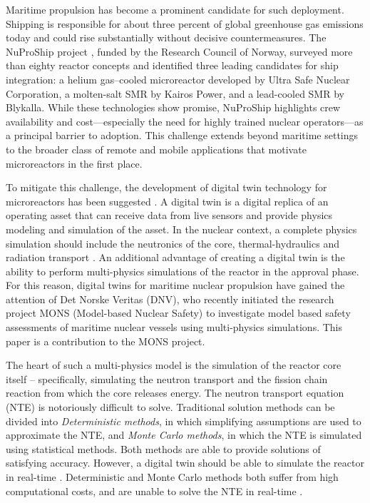 \documentclass[%
 reprint,
 amsmath,amssymb,
 aps,
]{revtex4-1}
\begin{document}
Maritime propulsion has become a prominent candidate for such deployment. Shipping is responsible for about three percent of global greenhouse gas
emissions today and could rise substantially without decisive countermeasures. The NuProShip project \cite{nuproship}, funded by the Research
Council of Norway, surveyed more than eighty reactor concepts and identified three leading candidates for ship integration: a helium gas–cooled
microreactor developed by Ultra Safe Nuclear Corporation, a molten-salt SMR by Kairos Power, and a lead-cooled SMR by Blykalla. While these
technologies show promise, NuProShip highlights crew availability and cost—especially the need for highly trained nuclear operators—as a
principal barrier to adoption. This challenge extends beyond maritime settings to the broader class of remote and mobile applications that
motivate microreactors in the first place.

To mitigate this challenge, the development of digital twin technology for microreactors has been suggested \cite{MAGNET}. A digital twin is a
digital replica of an operating asset that can receive data from live sensors and provide physics modeling and simulation of the asset. In the
nuclear context, a complete physics simulation should include the neutronics of the core, thermal-hydraulics and radiation transport
\cite{DT2024review}. An additional advantage of creating a digital twin is the ability to perform multi-physics simulations of the reactor in
the approval phase. For this reason, digital twins for maritime nuclear propulsion have gained the attention of Det Norske Veritas
(DNV), who recently initiated the research project MONS (Model-based Nuclear Safety) to investigate model based safety assessments of maritime
nuclear vessels using multi-physics simulations. This paper is a contribution to the MONS project.

The heart of such a multi-physics model is the simulation of the reactor core itself – specifically, simulating the neutron transport and the fission
chain reaction from which the core releases energy. The neutron transport equation (NTE) is notoriously difficult to solve. Traditional solution methods
can be divided into \textit{Deterministic methods}, in which simplifying assumptions are used to approximate the NTE, and \textit{Monte Carlo methods},
in which the NTE is simulated using statistical methods. Both methods are able to provide solutions of satisfying accuracy. However, a digital twin
should be able to simulate the reactor in real-time \cite{kochunas2021digital}. Deterministic and Monte Carlo methods both suffer from high
computational costs, and are unable to solve the NTE in real-time \cite{SHEN2022108861, ZHOU2024110759, sahadath2026characterization}.
\end{document}
